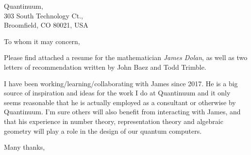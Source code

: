 \documentclass[a4paper, 10pt]{letter}
\begin{document}
\begin{letter}
{
    Quantinuum, \\
    303 South Technology Ct., \\
    Broomfield, CO 80021, USA
}

\opening{To whom it may concern,}


Please find attached a resume 
for the mathematician \emph{James Dolan},
as well as 
two letters of recommendation written by
John Baez and Todd Trimble.

I have been working/learning/collaborating with James
since 2017. He is a big source of inspiration and ideas
for the work I do at Quantinuum and it only seems reasonable 
that he is actually employed as a consultant or otherwise
by Quantinuum. I'm sure others will also benefit from
interacting with James, and that his experience in number
theory, representation theory and algebraic geometry
will play a role in the design of our quantum computers.

\closing{Many thanks,}

\end{letter}
\end{document}
